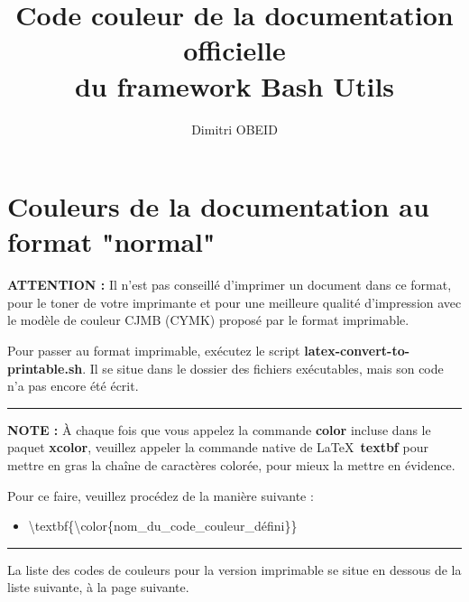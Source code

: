 \documentclass[a4paper,10pt]{article}
\title{\color{sec1}Code couleur de la documentation officielle \\du framework Bash Utils}\color{text}
\author{Dimitri OBEID}
\begin{document}
\maketitle

\color{sec1}
\section{Couleurs de la documentation au format "normal"}\color{text}

\begin{justify}
  \textbf{\color{case}ATTENTION :} Il n'est pas conseillé d'imprimer un document dans ce format, pour le toner de votre imprimante et pour une meilleure qualité d'impression avec le modèle de couleur CJMB (CYMK) proposé par le format imprimable.

  Pour passer au format imprimable, exécutez le script \textbf{\color{cmds}latex-convert-to-printable.sh}. Il se situe dans le dossier des fichiers exécutables, mais son code n'a pas encore été écrit.
\end{justify}

\color{text}\par\noindent\rule{\textwidth}{0.4pt}\color{text}

\begin{justify}
  \textbf{NOTE :} À chaque fois que vous appelez la commande \textbf{color} incluse dans le paquet \textbf{xcolor}, veuillez appeler la commande native de \LaTeX \ \textbf{textbf} pour mettre en gras la chaîne de caractères colorée, pour mieux la mettre en évidence.
\end{justify}

\begin{justify}
  Pour ce faire, veuillez procédez de la manière suivante :

  \begin{itemize}
    \item \textbackslash{textbf\{\textbackslash{color\{nom\_du\_code\_couleur\_défini}\}}\}
  \end{itemize}
\end{justify}

\color{text}\par\noindent\rule{\textwidth}{0.4pt}\color{text}

\begin{justify}
  La liste des codes de couleurs pour la version imprimable se situe en dessous de la liste suivante, à la page suivante.
\end{justify}
\end{document}
